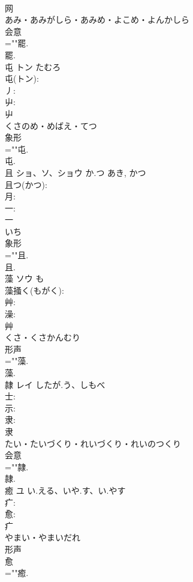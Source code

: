 \documentclass[8pt]{extreport}
\begin{document}
\begin{CJK}{UTF8}{min}
\\	网	
\\	あみ・あみがしら・あみめ・よこめ・よんかしら	
\\	会意 
\\	=""罷.
\\	罷.
\\	屯	トン	たむろ		
\\	屯(トン): 
\\	丿: 
\\	屮: 
\\	屮	
\\	くさのめ・めばえ・てつ	
\\	象形 
\\	=""屯.
\\	屯.
\\	且	ショ、ソ、ショウ	か.つ	あき, かつ	
\\	且つ(かつ): 
\\	月: 
\\	一: 
\\	一	
\\	いち	
\\	象形 
\\	=""且.
\\	且.
\\	藻	ソウ	も		
\\	藻掻く(もがく): 
\\	艸: 
\\	澡: 
\\	艸	
\\	くさ・くさかんむり	
\\	形声 
\\	=""藻.
\\	藻.
\\	隷	レイ	したが.う、しもべ		
\\	士: 
\\	示: 
\\	隶: 
\\	隶	
\\	たい・たいづくり・れいづくり・れいのつくり	
\\	会意 
\\	=""隷.
\\	隷.
\\	癒	ユ	い.える、いや.す、い.やす		
\\	疒: 
\\	愈: 
\\	疒	
\\	やまい・やまいだれ	
\\	形声 
\\	愈 
\\	=""癒.

\end{CJK}
\end{document}
